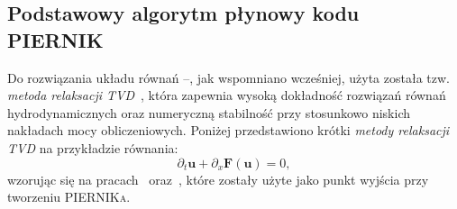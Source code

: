 \subsection{Podstawowy algorytm płynowy kodu \textsc{PIERNIK}}
Do rozwiązania układu równań --, jak wspomniano wcześniej,
użyta została tzw. \textit{metoda relaksacji TVD}~\cite{jin-xin-95}, która
zapewnia wysoką dokładność rozwiązań równań hydrodynamicznych oraz numeryczną
stabilność przy stosunkowo niskich nakładach mocy obliczeniowych. Poniżej
przedstawiono krótki \textit{metody relaksacji TVD} na przykładzie równania:
\begin{equation}\label{diffeuler}
   \partial_t \mathbf{u} + \partial_{x} \mathbf{F}(\mathbf{u}) = 0,
\end{equation}
wzorując się na pracach~\cite*{2003PASP..115..303T}
oraz~\cite*{2003ApJS..149..447P}, które zostały użyte jako punkt
wyjścia przy tworzeniu \textsc{PIERNIKa}. 

